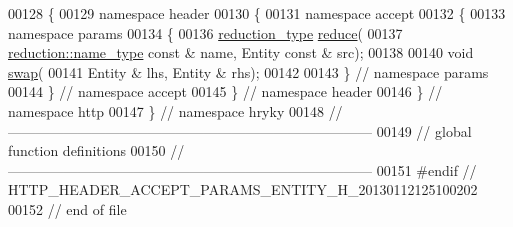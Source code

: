 \begin{DoxyCode}
00128 \{
00129 \textcolor{keyword}{namespace }header
00130 \{
00131 \textcolor{keyword}{namespace }accept
00132 \{
00133 \textcolor{keyword}{namespace }params
00134 \{
00136     \hyperlink{namespacehryky_a343a9a4c36a586be5c2693156200eadc}{reduction_type} \hyperlink{namespacehryky_1_1http_a08fc36a78a8e2908140fcd102829a566}{reduce}(
00137         \hyperlink{namespacehryky_1_1reduction_ac686c30a4c8d196bbd0f05629a6b921f}{reduction::name_type} \textcolor{keyword}{const} & name, Entity \textcolor{keyword}{const} & src);
00138 
00140     \textcolor{keywordtype}{void} \hyperlink{namespacehryky_1_1http_a38e62595ad532d18fbc65ceb61973aec}{swap}(
00141         Entity & lhs, Entity & rhs);
00142 
00143 \} \textcolor{comment}{// namespace params}
00144 \} \textcolor{comment}{// namespace accept}
00145 \} \textcolor{comment}{// namespace header}
00146 \} \textcolor{comment}{// namespace http}
00147 \} \textcolor{comment}{// namespace hryky}
00148 \textcolor{comment}{//
      ------------------------------------------------------------------------------}
00149 \textcolor{comment}{// global function definitions}
00150 \textcolor{comment}{//
      ------------------------------------------------------------------------------}
00151 \textcolor{preprocessor}{#endif // HTTP\_HEADER\_ACCEPT\_PARAMS\_ENTITY\_H\_20130112125100202}
00152 \textcolor{preprocessor}{}\textcolor{comment}{// end of file}
\end{DoxyCode}
